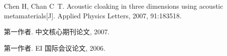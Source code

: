 \begin{publications}
  \item Chen H, Chan C~T. Acoustic cloaking in three dimensions using acoustic metamaterials[J]. Applied Physics Letters, 2007, 91:183518.
\end{publications}

\begin{publications*}
  \item 第一作者. 中文核心期刊论文, 2007.
  \item 第一作者. EI 国际会议论文, 2006.
\end{publications*}